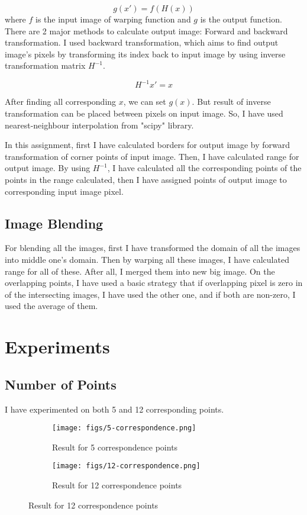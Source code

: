 \documentclass[12pt]{article}
\begin{document}
\begin{equation*}
    g(x') = f(H(x))
\end{equation*}
where $f$ is the input image of warping function and $g$ is the output function. There are 2 major methods to calculate output image: Forward and backward transformation. I used backward transformation, which aims to find output image's pixels by transforming its index back to input image by using inverse transformation matrix $H^{-1}$.

\begin{equation*}
    H^{-1} x' = x
\end{equation*}

After finding all corresponding $x$, we can set $g(x)$. But result of inverse transformation can be placed between pixels on input image. So, I have used nearest-neighbour interpolation from "scipy" library.

In this assignment, first I have calculated borders for output image by forward transformation of corner points of input image. Then, I have calculated range for output image. By using $H^{-1}$, I have calculated all the corresponding points of the points in the range calculated, then I have assigned points of output image to corresponding input image pixel.

\subsection{Image Blending}

For blending all the images, first I have transformed the domain of all the images into middle one's domain. Then by warping all these images, I have calculated range for all of these. After all, I merged them into new big image. On the overlapping points, I have used a basic strategy that if overlapping pixel is zero in of the intersecting images, I have used the other one, and if both are non-zero, I used the average of them.

\section{Experiments}
\subsection{Number of Points}
I have experimented on both 5 and 12 corresponding points.

\begin{figure}[H]
    \centering
    \begin{subfigure}{\textwidth}
        \texttt{[image: figs/5-correspondence.png]}
        \caption{Result for 5 correspondence points}
        \label{fig:5points}
    \end{subfigure}
    \begin{subfigure}{\textwidth}
        \texttt{[image: figs/12-correspondence.png]}
        \caption{Result for 12 correspondence points}
        \label{fig:12points}
    \end{subfigure}
\end{figure}
\end{document}
